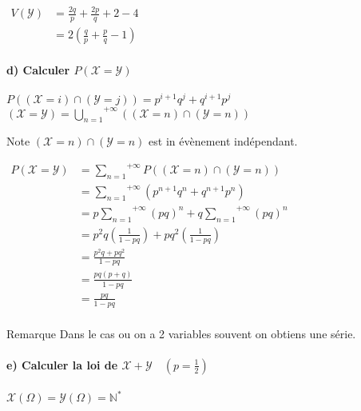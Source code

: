 \documentclass[a4paper, 12pt]{article}
\begin{document}
\begin{flushleft}
$
\begin{aligned}
V(\mathcal{Y}) &= \frac{2q}{p} + \frac{2p}{q} + 2 - 4 \\
&\boxed{= 2 (\frac{q}{p} + \frac{p}{q} - 1)}
\end{aligned}
$

\end{flushleft}


\paragraph{d) Calculer $P (\mathcal{X} = \mathcal{Y})$ \\}
$P ((\mathcal{X} = i) \cap (\mathcal{Y} = j)) = p^{i + 1} q^j + q^{i + 1} p^j$ \\
$(\mathcal{X} = \mathcal{Y}) = \overset{+\infty}{\underset{n = 1}{\bigcup}} ((\mathcal{X} = n) \cap (\mathcal{Y} = n))$ \\

\begin{note}{Note}
$(\mathcal{X} = n) \cap (\mathcal{Y} = n)$ est in évènement indépendant.
\end{note}

$
\begin{aligned}
P (\mathcal{X} = \mathcal{Y}) &= \overset{+\infty}{\underset{n = 1}{\sum}} P ((\mathcal{X} = n) \cap (\mathcal{Y} = n)) \\
&= \overset{+\infty}{\underset{n = 1}{\sum}} (p^{n + 1} q^n + q^{n + 1} p^n) \\
&= p \overset{+\infty}{\underset{n = 1}{\sum}} (pq)^n + q \overset{+\infty}{\underset{n = 1}{\sum}} (pq)^n \\
&= p^2 q \left (\frac{1}{1 - pq} \right ) + pq^2 \left (\frac{1}{1 - pq} \right ) \\
&= \frac{p^2q + pq^2}{1 - pq} \\
&= \frac{pq (p + q)}{1 - pq} \\
&\boxed{= \frac{pq}{1 - pq}} \\
\end{aligned}
$

\begin{remarque}{Remarque}
Dans le cas ou on a 2 variables souvent on obtiens une série.
\end{remarque}


\paragraph{e) Calculer la loi de $\mathcal{X + Y} \quad (p = \frac{1}{2})$ \\}
$\mathcal{X} (\Omega) = \mathcal{Y} (\Omega) = \mathbb{N}^*$ \\
\end{document}
